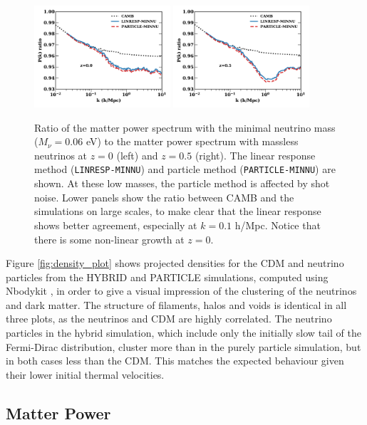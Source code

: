 \documentclass[useAMS, usenatbib]{mnras}
\begin{document}
\begin{figure}
\includegraphics[width=0.45\textwidth]{nuplots/pks_lowmass-10.pdf}
\includegraphics[width=0.45\textwidth]{nuplots/pks_lowmass-0_66670.pdf}
\caption{Ratio of the matter power spectrum with the minimal neutrino mass ($M_\nu = 0.06$ eV) to the matter power spectrum with massless neutrinos at $z=0$ (left) and $z=0.5$ (right). The linear response method (\texttt{LINRESP-MINNU}) and particle method (\texttt{PARTICLE-MINNU}) are shown. At these low masses, the particle method is affected by shot noise. Lower panels show the ratio between CAMB and the simulations on large scales, to make clear that the linear response shows better agreement, especially at $k = 0.1$ h/Mpc. Notice that there is some non-linear growth at $z=0$.}
\label{fig:minimal_mass}
\end{figure}


Figure \ref{fig:density_plot} shows projected densities for the CDM and neutrino particles from the HYBRID and PARTICLE simulations, computed using Nbodykit \citep{Hand_2017}, in order to give a visual impression of the clustering of the neutrinos and dark matter. The structure of filaments, halos and voids is identical in all three plots, as the neutrinos and CDM are highly correlated. The neutrino particles in the hybrid simulation, which include only the initially slow tail of the Fermi-Dirac distribution, cluster more than in the purely particle simulation, but in both cases less than the CDM. This matches the expected behaviour given their lower initial thermal velocities.

\subsection{Matter Power}
\label{sec:matterpower}
\end{document}
